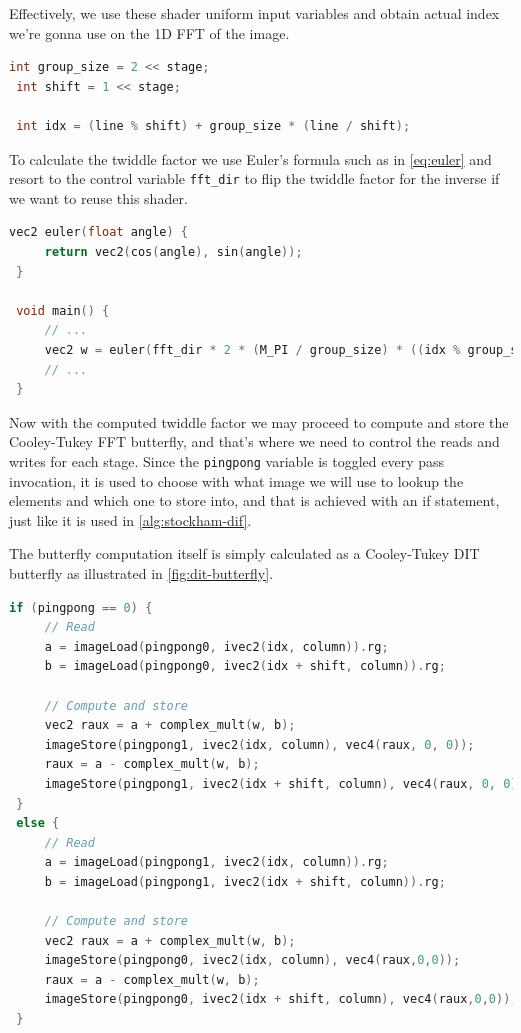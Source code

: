 \documentclass[
  oneside,
  11pt, a4paper,
  footinclude=true,
  headinclude=true,
  cleardoublepage=empty
]{scrbook}
\begin{document}
Effectively, we use these shader uniform input variables and obtain actual index we're gonna use on the 1D FFT of the image.

\begin{lstlisting}[language=C, caption={FFT element index}]
 int group_size = 2 << stage;
 int shift = 1 << stage;
 
 int idx = (line % shift) + group_size * (line / shift);
\end{lstlisting}

To calculate the twiddle factor we use Euler's formula such as in \autoref{eq:euler} and resort to the control variable \texttt{fft\_dir} to flip the twiddle factor for the inverse if we want to reuse this shader.

\begin{lstlisting}[language=C,label={Euler's formula}]
 vec2 euler(float angle) {
     return vec2(cos(angle), sin(angle));
 }
 
 void main() {
     // ...
     vec2 w = euler(fft_dir * 2 * (M_PI / group_size) * ((idx % group_size) % shift));
     // ...
 }
\end{lstlisting}

Now with the computed twiddle factor we may proceed to compute and store the Cooley-Tukey FFT butterfly, and that's where we need to control the reads and writes for each stage. Since the \texttt{pingpong} variable is toggled every pass invocation, it is used to choose with what image we will use to lookup the elements and which one to store into, and that is achieved with an if statement, just like it is used in \autoref{alg:stockham-dif}.

The butterfly computation itself is simply calculated as a Cooley-Tukey DIT butterfly as illustrated in \autoref{fig:dit-butterfly}.

\begin{lstlisting}[language=C,label={Computation of the Cooley-Tukey butterfly}]
 if (pingpong == 0) {
     // Read
     a = imageLoad(pingpong0, ivec2(idx, column)).rg;
     b = imageLoad(pingpong0, ivec2(idx + shift, column)).rg;

     // Compute and store
     vec2 raux = a + complex_mult(w, b);
     imageStore(pingpong1, ivec2(idx, column), vec4(raux, 0, 0));
     raux = a - complex_mult(w, b);
     imageStore(pingpong1, ivec2(idx + shift, column), vec4(raux, 0, 0));
 }
 else {
     // Read
     a = imageLoad(pingpong1, ivec2(idx, column)).rg;
     b = imageLoad(pingpong1, ivec2(idx + shift, column)).rg;
     
     // Compute and store
     vec2 raux = a + complex_mult(w, b);
     imageStore(pingpong0, ivec2(idx, column), vec4(raux,0,0));    
     raux = a - complex_mult(w, b);
     imageStore(pingpong0, ivec2(idx + shift, column), vec4(raux,0,0));
 }
\end{lstlisting}
\end{document}
